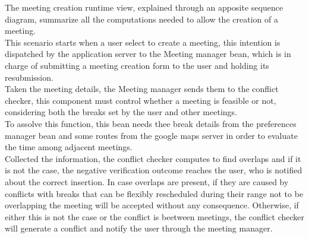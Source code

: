 The meeting creation runtime view, explained through an apposite sequence diagram, summarize all the computations needed to allow the creation of a meeting. \\
This scenario starts when a user select to create a meeting, this intention is dispatched by the application server to the Meeting manager bean, which is in charge of submitting a meeting creation form to the user and holding its resubmission. \\
Taken the meeting details, the Meeting manager sends them to the conflict checker, this component must control whether a meeting is feasible or not, considering both the breaks set by the user and other meetings. \\
To assolve this function, this bean needs thee break details from the preferences manager bean and some routes from the google maps server in order to evaluate the time among adjacent meetings. \\
Collected the information, the conflict checker computes to find overlaps and if it is not the case, the negative verification outcome reaches the user, who is notified about the correct insertion. In case overlaps are present, if they are caused by conflicts with breaks that can be flexibly rescheduled during their range not to be overlapping the meeting will be accepted without any consequence. Otherwise, if either this is not the case or the conflict is beetween meetings, the conflict checker will generate a conflict and notify the user through the meeting manager. 